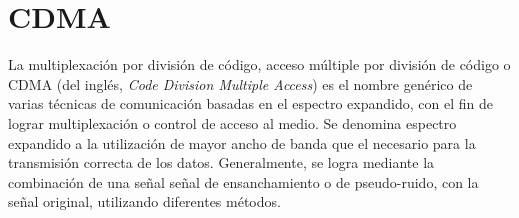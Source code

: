 




\section{CDMA}
\label{espectroensanchado}
La multiplexación por división de código, acceso múltiple por división de código o CDMA (del inglés, \textit{Code Division Multiple Access}) es el nombre genérico de varias técnicas de comunicación basadas en el espectro expandido, con el fin de lograr multiplexación o control de acceso al medio. 
Se denomina espectro expandido a la utilización de mayor ancho de banda que el necesario para la transmisión correcta de los datos. Generalmente, se logra mediante la combinación de una señal señal de ensanchamiento o de pseudo-ruido, con la señal original, utilizando diferentes métodos.

